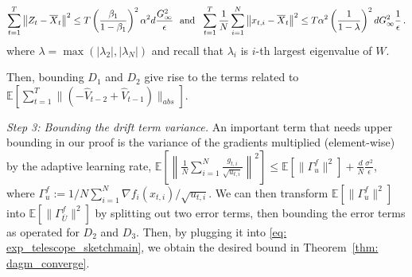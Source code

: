\documentclass[11pt]{article}
\begin{document}
 \begin{align}\notag
\sum_{t=1}^T\left\|  Z_{t} -  \overline X_{t}\right\|^2 \leq T \left( \frac{\beta_1}{1-\beta_1}\right)^2 \alpha^2 d \frac{G_{\infty}^2}{\epsilon} \text{\ \ and\ \ } 
\sum_{t=1}^T\frac{1}{N}\sum_{i=1}^N\left\| {  x_{t,i} -   \overline X_{t}}  \right\|^2 \leq T \alpha^2 \left (\frac{1}{1-\lambda} \right)^2 d G_{\infty}^2 \frac{1}{\epsilon} \,.
 \end{align}
 where $\lambda = \max (|\lambda_2|,|\lambda_N|)$ and recall that $\lambda_i$ is $i$-th largest eigenvalue of $W$.
 

Then, bounding $D_1$ and $D_2$ give rise to the terms related to $    \mathbb E \left [    \sum_{t=1}^T  \| ( - \hat V_{t-2} + \hat V_{t-1}) \|_{abs}   \right]$.

\vspace{0.1in}

\textsl{Step 3: Bounding the drift term variance.}\hspace{0.01in} An important term that needs upper bounding in our proof is the variance of the gradients multiplied (element-wise) by the adaptive learning rate, $ \mathbb E\left[ \left\| \frac{1}{N} \sum_{i=1}^N \frac{g_{t,i}}{\sqrt{u_{t,i}}} \right\|^2 \right]  \leq   \mathbb E [\| \Gamma_{u}^f\|^2 ] + \frac{d}{N}   \frac{ \sigma^2 }{\epsilon}$,
 where $ \Gamma_{u}^f := 1/N \sum_{i=1}^N \nabla f_i(x_{t,i})/\sqrt{u_{t,i}} $. We can then transform $\mathbb E [\| \Gamma_{u}^f\|^2 ]$ into $\mathbb E [\|\Gamma_{\overline{U}}^f \|^2]$ by splitting out two error terms, then bounding the error terms as operated for $D_2$ and $D_3$. Then, by plugging it into \eqref{eq: exp_telescope_sketchmain}, we obtain the desired bound in Theorem~\ref{thm: dagm_converge}.


\vspace{0.1in}
\end{document}
